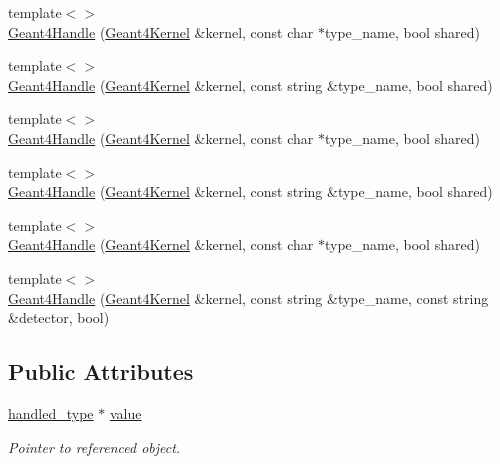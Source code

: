 \begin{DoxyCompactItemize}
\item 
{\footnotesize template$<$$>$ }\\\hyperlink{class_d_d4hep_1_1_simulation_1_1_geant4_handle_a089c38776dd6c86047bb581db7a0b145}{Geant4\+Handle} (\hyperlink{class_d_d4hep_1_1_simulation_1_1_geant4_kernel}{Geant4\+Kernel} \&kernel, const char $\ast$type\+\_\+name, bool shared)
\item 
{\footnotesize template$<$$>$ }\\\hyperlink{class_d_d4hep_1_1_simulation_1_1_geant4_handle_ad42d43ea2a060ed1a484a5e65e201e53}{Geant4\+Handle} (\hyperlink{class_d_d4hep_1_1_simulation_1_1_geant4_kernel}{Geant4\+Kernel} \&kernel, const string \&type\+\_\+name, bool shared)
\item 
{\footnotesize template$<$$>$ }\\\hyperlink{class_d_d4hep_1_1_simulation_1_1_geant4_handle_af736cadbc360dc972f86c39321a03ef7}{Geant4\+Handle} (\hyperlink{class_d_d4hep_1_1_simulation_1_1_geant4_kernel}{Geant4\+Kernel} \&kernel, const char $\ast$type\+\_\+name, bool shared)
\item 
{\footnotesize template$<$$>$ }\\\hyperlink{class_d_d4hep_1_1_simulation_1_1_geant4_handle_ae208c5c7c92cb3f5ecf288633a52f30c}{Geant4\+Handle} (\hyperlink{class_d_d4hep_1_1_simulation_1_1_geant4_kernel}{Geant4\+Kernel} \&kernel, const string \&type\+\_\+name, bool shared)
\item 
{\footnotesize template$<$$>$ }\\\hyperlink{class_d_d4hep_1_1_simulation_1_1_geant4_handle_ab390031f97b424ec92c174467874ae01}{Geant4\+Handle} (\hyperlink{class_d_d4hep_1_1_simulation_1_1_geant4_kernel}{Geant4\+Kernel} \&kernel, const char $\ast$type\+\_\+name, bool shared)
\item 
{\footnotesize template$<$$>$ }\\\hyperlink{class_d_d4hep_1_1_simulation_1_1_geant4_handle_ab0d256729ec1d69372b9dd713de7f738}{Geant4\+Handle} (\hyperlink{class_d_d4hep_1_1_simulation_1_1_geant4_kernel}{Geant4\+Kernel} \&kernel, const string \&type\+\_\+name, const string \&detector, bool)
\end{DoxyCompactItemize}
\subsection*{Public Attributes}
\begin{DoxyCompactItemize}
\item 
\hyperlink{class_d_d4hep_1_1_simulation_1_1_geant4_handle_a35e583b9228e38c95d23112ad19b645d}{handled\+\_\+type} $\ast$ \hyperlink{class_d_d4hep_1_1_simulation_1_1_geant4_handle_a5bd7f10667956413e9aa66cad5ad9d7d}{value}
\begin{DoxyCompactList}\small\item\em Pointer to referenced object. \end{DoxyCompactList}\end{DoxyCompactItemize}
